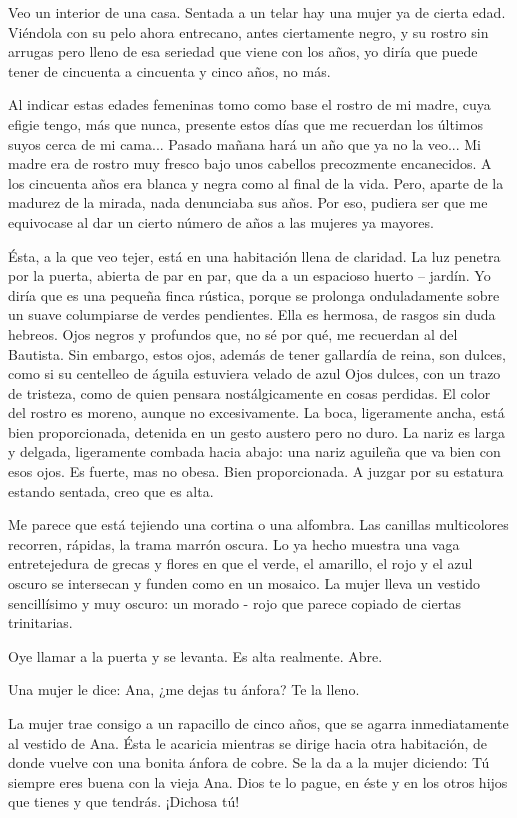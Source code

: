 \documentclass[12pt, twoside, openright]{book} %
\begin{document}
Veo un interior de una casa. Sentada a un telar hay una mujer ya de cierta edad. Viéndola con su pelo ahora entrecano, antes ciertamente negro, y su rostro sin arrugas pero lleno de esa seriedad que viene con los años, yo diría que puede tener de cincuenta a cincuenta y cinco años, no más. 

 Al indicar estas edades femeninas tomo como base el rostro de mi madre, cuya efigie tengo, más que nunca, presente estos días que me recuerdan los últimos suyos cerca de mi cama... Pasado mañana hará un año que ya no la veo... Mi madre era de rostro muy fresco bajo unos cabellos precozmente encanecidos. A los cincuenta años era blanca y negra como al final de la vida. Pero, aparte de la madurez de la mirada, nada denunciaba sus años. Por eso, pudiera ser que me equivocase al dar un cierto número de años a las mujeres ya mayores. 

Ésta, a la que veo tejer, está en una habitación llena de claridad. La luz penetra por la puerta, abierta de par en par, que da a un espacioso huerto – jardín. Yo diría que es una pequeña finca rústica, porque se prolonga onduladamente sobre un suave columpiarse de verdes pendientes. Ella es hermosa, de rasgos sin duda hebreos. Ojos negros y profundos que, no sé por qué, me recuerdan al del Bautista. Sin embargo, estos ojos, además de tener gallardía de reina, son dulces, como si su centelleo de águila estuviera velado de azul Ojos dulces, con un trazo de tristeza, como de quien pensara nostálgicamente en cosas perdidas. El color del rostro es moreno, aunque no excesivamente. La boca, ligeramente ancha, está bien proporcionada, detenida en un gesto austero pero no duro. La nariz es larga y delgada, ligeramente combada hacia abajo: una nariz aguileña que va bien con esos ojos. Es fuerte, mas no obesa. Bien proporcionada. A juzgar por su estatura estando sentada, creo que es alta. 

Me parece que está tejiendo una cortina o una alfombra. Las canillas multicolores recorren, rápidas, la trama marrón oscura. Lo ya hecho muestra una vaga entretejedura de grecas y flores en que el verde, el amarillo, el rojo y el azul oscuro se intersecan y funden como en un mosaico. La mujer lleva un vestido sencillísimo y muy oscuro: un morado - rojo que parece copiado de ciertas trinitarias. 

Oye llamar a la puerta y se levanta. Es alta realmente. Abre. 

Una mujer le dice: Ana, ¿me dejas tu ánfora? Te la lleno. 

La mujer trae consigo a un rapacillo de cinco años, que se agarra inmediatamente al vestido de Ana. Ésta le acaricia mientras se dirige hacia otra habitación, de donde vuelve con una bonita ánfora de cobre. Se la da a la mujer diciendo: Tú siempre eres buena con la vieja Ana. Dios te lo pague, en éste y en los otros hijos que tienes y que tendrás. ¡Dichosa tú!
\end{document}
